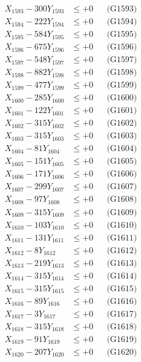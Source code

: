 \documentclass[a4paper,10pt]{article}
\begin{document}
{\begin{align}
X_{1593} - 300Y_{1593} &\leq +0 && \text{(G1593)} \\
X_{1594} - 222Y_{1594} &\leq +0 && \text{(G1594)} \\
X_{1595} - 584Y_{1595} &\leq +0 && \text{(G1595)} \\
X_{1596} - 675Y_{1596} &\leq +0 && \text{(G1596)} \\
X_{1597} - 548Y_{1597} &\leq +0 && \text{(G1597)} \\
X_{1598} - 882Y_{1598} &\leq +0 && \text{(G1598)} \\
X_{1599} - 477Y_{1599} &\leq +0 && \text{(G1599)} \\
X_{1600} - 285Y_{1600} &\leq +0 && \text{(G1600)} \\
\allowbreak
X_{1601} - 122Y_{1601} &\leq +0 && \text{(G1601)} \\
X_{1602} - 315Y_{1602} &\leq +0 && \text{(G1602)} \\
X_{1603} - 315Y_{1603} &\leq +0 && \text{(G1603)} \\
X_{1604} - 81Y_{1604} &\leq +0 && \text{(G1604)} \\
X_{1605} - 151Y_{1605} &\leq +0 && \text{(G1605)} \\
X_{1606} - 171Y_{1606} &\leq +0 && \text{(G1606)} \\
X_{1607} - 299Y_{1607} &\leq +0 && \text{(G1607)} \\
X_{1608} - 97Y_{1608} &\leq +0 && \text{(G1608)} \\
X_{1609} - 315Y_{1609} &\leq +0 && \text{(G1609)} \\
X_{1610} - 103Y_{1610} &\leq +0 && \text{(G1610)} \\
\allowbreak
X_{1611} - 131Y_{1611} &\leq +0 && \text{(G1611)} \\
X_{1612} - 8Y_{1612} &\leq +0 && \text{(G1612)} \\
X_{1613} - 219Y_{1613} &\leq +0 && \text{(G1613)} \\
X_{1614} - 315Y_{1614} &\leq +0 && \text{(G1614)} \\
X_{1615} - 315Y_{1615} &\leq +0 && \text{(G1615)} \\
X_{1616} - 89Y_{1616} &\leq +0 && \text{(G1616)} \\
X_{1617} - 3Y_{1617} &\leq +0 && \text{(G1617)} \\
X_{1618} - 315Y_{1618} &\leq +0 && \text{(G1618)} \\
X_{1619} - 91Y_{1619} &\leq +0 && \text{(G1619)} \\
X_{1620} - 207Y_{1620} &\leq +0 && \text{(G1620)} \\

\end{align}}
\end{document}
